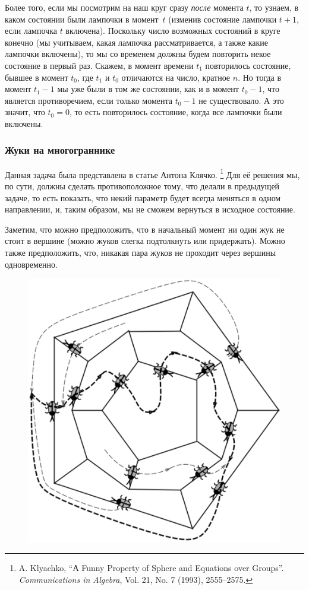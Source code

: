 Более того, если мы посмотрим на наш круг сразу \emph{после} момента $t$, то узнаем, в каком состоянии были лампочки в момент~$t$ (изменив состояние лампочки $t+1$, если лампочка $t$ включена).
Поскольку число возможных состояний в круге конечно (мы учитываем, какая лампочка рассматривается, а также какие лампочки включены), то мы со временем должны будем повторить некое состояние в первый раз.
Скажем, в момент времени $t_1$ повторилось состояние, бывшее в момент $t_0$, где $t_1$ и $t_0$ отличаются на число, кратное $n$.
Но тогда в момент $t_1 - 1$ мы уже были в том же состоянии, как и в момент $t_0 - 1$, что является противоречием, если только момента $t_0 - 1$ не существовало.
А это значит, что $t_0=0$, то есть повторилось состояние, когда все лампочки были включены.
\heart

\subsubsection*{Жуки на многограннике}%

Данная задача была представлена в статье Антона Клячко.%
\footnote{A. Klyachko, ``А Funny Property of Sphere and Equations over Groups''. \emph{Communications in Algebra}, Vol. 21, No. 7 (1993), 2555--2575.} 
Для её решения мы, по сути, должны сделать противоположное тому, что делали в предыдущей задаче, то есть показать, что некий параметр будет всегда меняться в одном направлении, и, таким образом, мы не сможем вернуться в исходное состояние.

\medskip

Заметим, что можно предположить, что в начальный момент ни один жук не стоит в вершине (можно жуков слегка подтолкнуть или придержать).
Можно также предположить, что, никакая пара жуков не проходит через вершины одновременно.

\begin{figure}[h!]
\centering
\includegraphics[scale=0.5]{Figs/Algorithms/dodec}
\end{figure}

